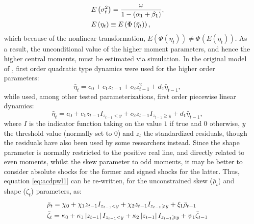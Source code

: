 \begin{equation}\label{eq:acd3}
\begin{gathered}
  E\left( {\sigma_t^2} \right) = \frac{\omega }
{{1 - \left( {{\alpha _1} + {\beta _1}} \right)}}, \hfill \\
  E\left( {{\eta_t}} \right) \equiv E\left( {\Phi \left( {{{\bar \eta}_t}} \right)} \right), \hfill \\
\end{gathered}
\end{equation}
which because of the nonlinear transformation, $E\left( {\Phi \left( {{{\bar \eta }_t}} \right)} \right) \ne \Phi \left( {E\left( {{{\bar \eta }_t}} \right)} \right)$.
As a result, the unconditional value of the higher moment parameters, and hence the higher central moments, must be estimated via simulation.
In the original model of \citet{Hansen1994}, first order quadratic type dynamics were used for the higher order parameters:
\begin{equation}\label{eq:acdquad1}
{{\bar \eta }_{t}} = {c_0} + {c_1}{z_{t - 1}} + {c_2}z_{t - 1}^2 + {d_1}{{\bar \eta }_{t - 1}},
\end{equation}
while \citet{Jondeau2003} used, among other tested parameterizations, first order piecewise linear dynamics:
\begin{equation}\label{eq:acdpwl1}
{{\bar \eta }_{t}} = {c_0} + {c_1}{z_{t - 1}}{I_{{z_{t - 1}} < y}} + {c_2}{z_{t - 1}}{I_{{z_{t - 1}} \geqslant y}} + {d_1}{{\bar \eta }_{t - 1}},
\end{equation}
where $I$ is the indicator function taking on the value $1$ if true and $0$ otherwise, $y$ the threshold value (normally set to $0$) and $z_t$ the standardized residuals, though the residuals have also been used by some researchers instead. Since the shape parameter is normally restricted to the positive real line, and directly related to even moments, whilst the skew parameter to odd moments, it may be better to consider absolute shocks for the former and signed shocks for the latter. Thus, equation \ref{eq:acdpwl1} can be re-written, for the unconstrained skew ($\bar \rho_t$) and shape ($\bar \zeta_t$) parameters, as:
\begin{equation}\label{eq:acdpwl2}
\begin{gathered}
  {{\bar \rho }_t} = {\chi _0} + {\chi _1}{z_{t - 1}}{I_{{z_{t - 1}} < y}} + {\chi _2}{z_{t - 1}}{I_{{z_{t - 1}} \geqslant y}} + {\xi _1}{{\bar \rho }_{t - 1}} \hfill \\
  {{\bar \zeta }_t} = {\kappa _0} + {\kappa _1}\left| {{z_{t - 1}}} \right|{I_{{z_{t - 1}} < y}} + {\kappa _2}\left| {{z_{t - 1}}} \right|{I_{{z_{t - 1}} \geqslant y}} + {\psi _1}{{\bar \zeta }_{t - 1}} \hfill \\
\end{gathered}
\end{equation}
